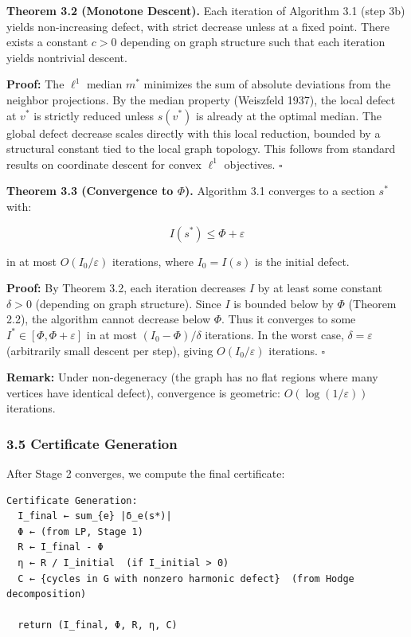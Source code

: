 \documentclass[
]{article}
\begin{document}
\textbf{Theorem 3.2 (Monotone Descent).} Each iteration of Algorithm 3.1
(step 3b) yields non-increasing defect, with strict decrease unless at a
fixed point. There exists a constant \(c > 0\) depending on graph
structure such that each iteration yields nontrivial descent.

\textbf{Proof:} The \(\ell^1\) median \(m^*\) minimizes the sum of
absolute deviations from the neighbor projections. By the median
property (Weiszfeld 1937), the local defect at \(v^*\) is strictly
reduced unless \(s(v^*)\) is already at the optimal median. The global
defect decrease scales directly with this local reduction, bounded by a
structural constant tied to the local graph topology. This follows from
standard results on coordinate descent for convex \(\ell^1\) objectives.
\(\square\)

\textbf{Theorem 3.3 (Convergence to \(\Phi\)).} Algorithm 3.1 converges
to a section \(s^*\) with:

\[I(s^*) \leq \Phi + \varepsilon\]

in at most \(O(I_0 / \varepsilon)\) iterations, where \(I_0 = I(s)\) is
the initial defect.

\textbf{Proof:} By Theorem 3.2, each iteration decreases \(I\) by at
least some constant \(\delta > 0\) (depending on graph structure). Since
\(I\) is bounded below by \(\Phi\) (Theorem 2.2), the algorithm cannot
decrease below \(\Phi\). Thus it converges to some
\(I^* \in [\Phi, \Phi + \varepsilon]\) in at most
\((I_0 - \Phi) / \delta\) iterations. In the worst case,
\(\delta = \varepsilon\) (arbitrarily small descent per step), giving
\(O(I_0 / \varepsilon)\) iterations. \(\square\)

\textbf{Remark:} Under non-degeneracy (the graph has no flat regions
where many vertices have identical defect), convergence is geometric:
\(O(\log(1/\varepsilon))\) iterations.

\subsubsection{3.5 Certificate Generation}\label{certificate-generation}

After Stage 2 converges, we compute the final certificate:

\begin{verbatim}
Certificate Generation:
  I_final ← sum_{e} |δ_e(s*)|
  Φ ← (from LP, Stage 1)
  R ← I_final - Φ
  η ← R / I_initial  (if I_initial > 0)
  C ← {cycles in G with nonzero harmonic defect}  (from Hodge decomposition)

  return (I_final, Φ, R, η, C)
\end{verbatim}
\end{document}
